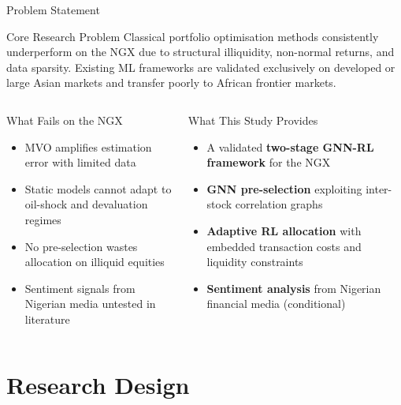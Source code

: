 \documentclass[aspectratio=169,11pt]{beamer}
\begin{document}
	\begin{frame}{Problem Statement}
		\vspace{-14pt}
		\begin{alertblock}{Core Research Problem}
			Classical portfolio optimisation methods consistently underperform on the NGX due to structural illiquidity, non-normal returns, and data sparsity.
			Existing ML frameworks are validated exclusively on developed or large
			Asian markets and transfer poorly to African frontier markets.
		\end{alertblock}
		\vspace{-10pt}
		\begin{columns}[T]
			\begin{block}{What Fails on the NGX}
				\begin{itemize}\setlength\itemsep{3pt}
					\item MVO amplifies estimation error with limited data
					\citep{markowitz2024}
					\item Static models cannot adapt to oil-shock and
					devaluation regimes
					\item No pre-selection wastes allocation on illiquid
					equities
					\item Sentiment signals from Nigerian media
					untested in literature
				\end{itemize}
			\end{block}
			\begin{exampleblock}{What This Study Provides}
				\begin{itemize}\setlength\itemsep{3pt}
					\item A validated \textbf{two-stage GNN-RL framework}
					for the NGX
					\item \textbf{GNN pre-selection} exploiting
					inter-stock correlation graphs
					\item \textbf{Adaptive RL allocation} with embedded
					transaction costs and liquidity constraints
					\item \textbf{Sentiment analysis} from Nigerian
					financial media (conditional)
				\end{itemize}
			\end{exampleblock}
		\end{columns}
	\end{frame}
	
	\section{Research Design}
	
\end{document}
